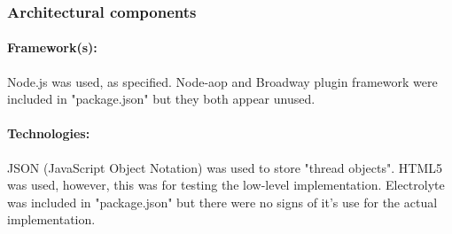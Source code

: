 \subsubsection{Architectural components}
\paragraph {Framework(s):}
Node.js was used, as specified. Node-aop and Broadway plugin framework were included in "package.json"  but they both appear unused.
\par
\paragraph{Technologies:}
 JSON (JavaScript Object Notation) was used to store "thread objects". HTML5 was used, however, this was for testing the low-level implementation. Electrolyte was included in "package.json" but there were no signs of it's use for the actual implementation.
\par